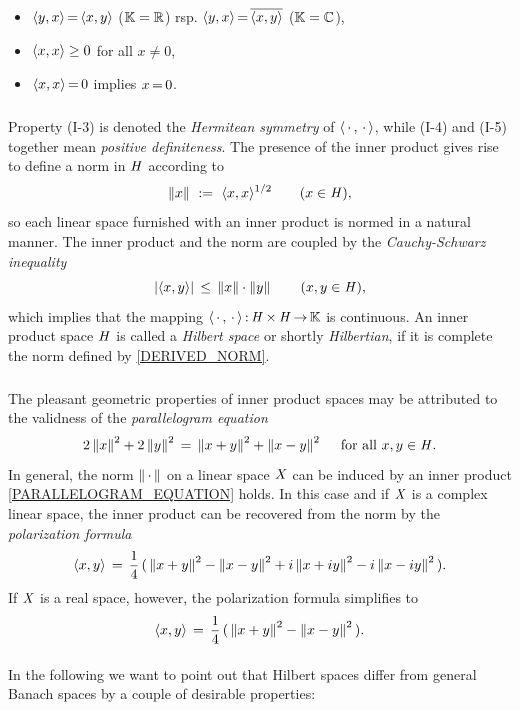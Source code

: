 \documentclass[11pt,twoside]{article}
\begin{document}
\begin{itemize}[leftmargin=35pt]
\item[(I-3)]
$\langle y,x \rangle {\,=\,}           \langle x,y \rangle$  (${\mathbb{K}}={\mathbb{R}}$) rsp.
$\langle y,x \rangle {\,=\,} \overline{\langle x,y \rangle}$ (${\mathbb{K}}={\mathbb{C}}$),
\item[(I-4)]
$\langle x,x \rangle \geq 0$ for all $x \neq 0$,
\item[(I-5)]
$\langle x,x \rangle {\,=\,} 0$ implies $x {\,=\,} 0$.
\end{itemize}

\subparagraph{}
Property (I-3) is denoted the \textit{Hermitean symmetry}
of $\langle \,\cdot\,,\,\cdot\, \rangle$,
while (I-4) and (I-5) together mean \textit{positive definiteness}.
The presence of the inner product gives rise to define a norm in $\mathit{H}$
according to
\begin{equation}\label{DERIVED_NORM}
\left\lVert x \right\rVert \, \,:=\, \, \langle x,x \rangle ^{1/2} \quad \quad (x \in \mathit{H}),
\end{equation}
so each linear space furnished with an inner product is normed
in a natural manner.
The inner product and the norm are coupled by
the \textit{Cauchy-Schwarz} \textit{inequality}
\[
\abs{\scalar{x}{y}} \, \leq \,
\norm{x} \cdot \norm{y} \quad \quad (x,y \in \hilH),
\]
which implies that the mapping
$\langle \,\cdot\,,\,\cdot\, \rangle{\,:\,}\mathit{H} {\,\times\,} \mathit{H} {\,\to\,} {\mathbb{K}}$ is continuous.
An inner product space $\mathit{H}$ is called a \textit{Hilbert space}
or shortly \textit{Hilbertian},
if it is complete {\wrt} the norm defined by \eqref{DERIVED_NORM}.

\subparagraph{} %
The pleasant geometric properties of inner product spaces
may be attributed to the validness of the \textit{parallelogram equation}
\begin{equation}\label{PARALLELOGRAM_EQUATION}
2 \left\lVert x \right\rVert^2 + 2 \left\lVert y \right\rVert^2 \,=\, \left\lVert x+y \right\rVert^2 + \left\lVert x-y \right\rVert^2
\quad \mbox{ for all } x,y \in \mathit{H}.
\end{equation}
In general,
the norm $\left\lVert \,\cdot\, \right\rVert$ on a linear space $\mathit{X}$
can be induced by an inner product
\iff \eqref{PARALLELOGRAM_EQUATION} holds.
In this case and if $\mathit{X}$ is a complex linear space,
the inner product can be recovered from the norm
by the \textit{polarization formula}
\[
\langle x,y \rangle
\,=\,
\frac{1}{4} \,
(\,
\left\lVert x + y \right\rVert^2 - \left\lVert x-y \right\rVert^2 +i \left\lVert x+iy \right\rVert^2 - i \left\lVert x-iy \right\rVert^2
\,).
\]
If $\mathit{X}$ is a real space,
however,
the polarization formula simplifies to
\[
\langle x,y \rangle \,=\,
\frac{1}{4} \,
(\,
\left\lVert x + y \right\rVert^2 - \left\lVert x-y \right\rVert^2
\,).
\]

\paragraph{} %
In the following we want to point out
that Hilbert spaces differ from general Banach spaces
by a couple of desirable properties:
\end{document}
